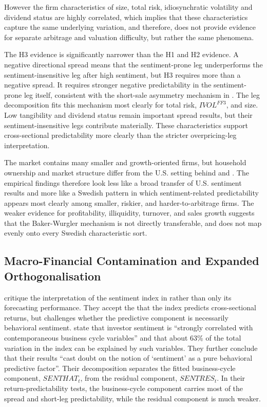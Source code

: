 \documentclass[11pt]{article}
\newcommand{\var}[1]{\ensuremath{#1}}
\begin{document}
However the firm characteristics of size, total risk, idiosynchratic volatility and dividend status are highly correlated, which implies that these characteristics capture the same underlying variation, and therefore, does not provide evidence for separate arbitrage and valuation difficulty, but rather the same phenomena.

The H3 evidence is significantly narrower than the H1 and H2 evidence. A negative directional spread means that the sentiment-prone leg underperforms the sentiment-insensitive leg after high sentiment, but H3 requires more than a negative spread. It requires stronger negative predictability in the sentiment-prone leg itself, consistent with the short-sale asymmetry mechanism in \citet{stambaugh2012short}. The leg decomposition fits this mechanism most clearly for total risk, \var{IVOL^{FF3}}, and size. Low tangibility and dividend status remain important spread results, but their sentiment-insensitive legs contribute materially. These characteristics support cross-sectional predictability more clearly than the stricter overpricing-leg interpretation.

The market contains many smaller and growth-oriented firms, but household ownership and market structure differ from the U.S. setting behind \citet{baker2006sentiment} and \citet{stambaugh2012short}. The empirical findings therefore look less like a broad transfer of U.S. sentiment results and more like a Swedish pattern in which sentiment-related predictability appears most clearly among smaller, riskier, and harder-to-arbitrage firms. The weaker evidence for profitability, illiquidity, turnover, and sales growth suggests that the Baker-Wurgler mechanism is not directly transferable, and does not map evenly onto every Swedish characteristic sort.

\subsection{Macro-Financial Contamination and Expanded Orthogonalisation}
\citet{sibley2012sentimental} critique the interpretation of the sentiment index in \citet{baker2006sentiment} rather than only its forecasting performance. They accept the that the index predicts cross-sectional returns, but challenges whether the predictive component is necessarily behavioral sentiment. \citet{sibley2012sentimental} state that investor sentiment is \enquote{strongly correlated with contemporaneous business cycle variables} and that about 63\% of the total variation in the index can be explained by such variables. They further conclude that their results \enquote{cast doubt on the notion of \enquote{sentiment} as a pure behavioral predictive factor}. Their decomposition separates the fitted business-cycle component, \var{SENTHAT_t}, from the residual component, \var{SENTRES_t}. In their return-predictability tests, the business-cycle component carries most of the spread and short-leg predictability, while the residual component is much weaker. 
\end{document}
